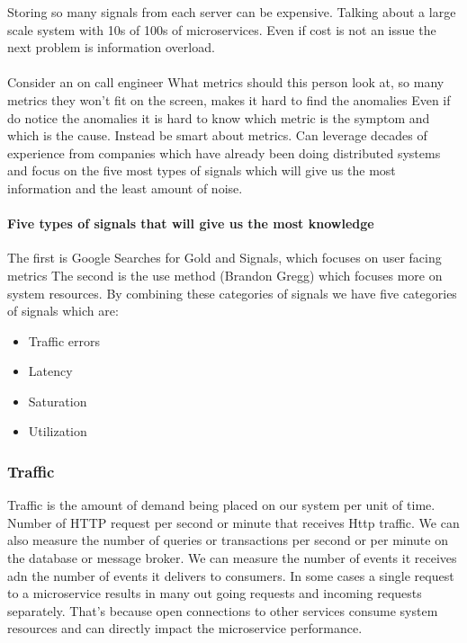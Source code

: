 \documentclass[a4paper, 11pt]{book}
\begin{document}
    Storing so many signals from each server can be expensive.
    Talking about a large scale system with 10s of 100s of microservices.
    Even if cost is not an issue the next problem is information overload.

    \paragraph{}
    Consider an on call engineer
    What metrics should this person look at, so many metrics they won't fit on the screen, makes it hard to find the anomalies
    Even if do notice the anomalies it is hard to know which metric is the symptom and which is the cause.
    Instead be smart about metrics.
    Can leverage decades of experience from companies which have already been doing distributed systems and focus on the five most types of signals which will give us the most information and the least amount of noise.

    \paragraph{Five types of signals that will give us the most knowledge}
    The first is Google Searches for Gold and Signals, which focuses on user facing metrics
    The second is the use method (Brandon Gregg) which focuses more on system resources.
    By combining these categories of signals we have five categories of signals which are:

    \begin{itemize}
        \item Traffic errors
        \item Latency
        \item Saturation
        \item Utilization
    \end{itemize}

    \subsubsection{Traffic}
    Traffic is the amount of demand being placed on our system per unit of time.
    Number of HTTP request per second or minute that receives Http traffic.
    We can also measure the number of queries or transactions per second or per minute on the database or message broker.
    We can measure the number of events it receives adn the number of events it delivers to consumers.
    In some cases a single request to a microservice results in many out going requests and incoming requests separately.
    That's because open connections to other services consume system resources and can directly impact the microservice performance.
\end{document}
